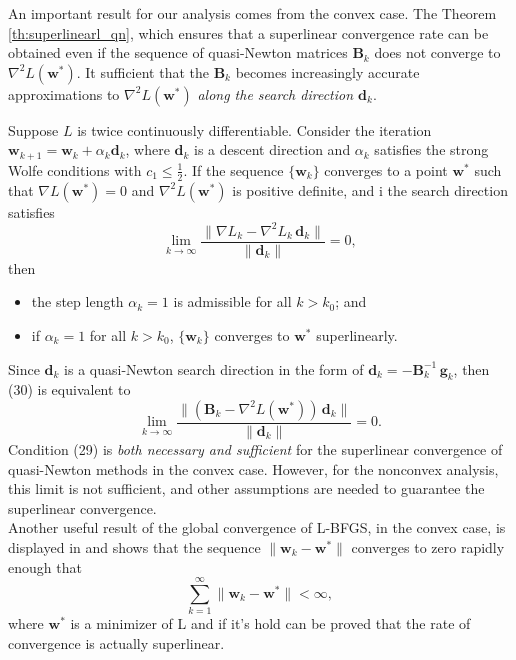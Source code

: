 An important result for our analysis comes from the convex case. The Theorem \ref{th:superlinearl_qn}, which ensures that a superlinear convergence rate can be obtained even if the sequence of quasi-Newton matrices $\mathbf{B}_k$ does not converge to $\nabla^2 L(\mathbf{w}^*)$. It sufficient that the $\mathbf{B}_k$ becomes increasingly accurate approximations to $\nabla^2 L(\mathbf{w}^*)$ \emph{along the search direction $\mathbf{d}_k$}.

\begin{theorem}
\label{th:superlinearl_qn}
Suppose $L$ is twice continuously differentiable. Consider the iteration $\mathbf{w}_{k+1}=\mathbf{w}_k + \alpha_k \mathbf{d}_k$, where $\mathbf{d}_k$ is a descent direction and $\alpha_k$ satisfies the strong Wolfe conditions with $c_1 \leq \frac{1}{2}$. If the sequence $\{ \mathbf{w}_k\}$ converges to a point $\mathbf{w^*}$ such that $\nabla L (\mathbf{w}^*) = 0$ and $\nabla^2 L(\mathbf{w}^*)$ is positive definite, and i the search direction satisfies
\begin{equation}
      \lim_{k\to\infty} \frac{\| \nabla L_k - \nabla^2 L_k \, \mathbf{d}_k\|}{\| \mathbf{d}_k\|} = 0,
\end{equation}
then
\begin{itemize}
    \item the step length $\alpha_k = 1$ is admissible for all $k>k_0$; and
    \item if $\alpha_k = 1$ for all $k>k_0$, $\{ \mathbf{w}_k\}$ converges to $\mathbf{w}^*$ superlinearly. 
\end{itemize}
\end{theorem}
Since $\mathbf{d}_k$ is a quasi-Newton search direction in the form of $\mathbf{d}_k = - \mathbf{B}_k^{-1} \, \mathbf{g}_k$, then (30) is equivalent to
\begin{equation}
      \lim_{k\to\infty} \frac{\| (\mathbf{B}_k - \nabla^2 L(\mathbf{w}^*)) \, \mathbf{d}_k\|}{\| \mathbf{d}_k\|} = 0.
\end{equation}
Condition (29) is \emph{both necessary and sufficient} for the superlinear convergence of quasi-Newton methods in the convex case. However, for the nonconvex analysis, this limit is not sufficient, and other assumptions are needed to guarantee the superlinear convergence.\\ 

Another useful result of the global convergence of L-BFGS, in the convex case, is displayed in \cite{Nocedal} and shows that the sequence $\| \mathbf{w}_k - \mathbf{w}^*\|$ converges to zero rapidly enough that
\begin{equation}\label{eq:seq_to_zero_rapidly}
    \sum_{k=1}^{\infty} \| \mathbf{w}_k - \mathbf{w}^*\| < \infty,
\end{equation}
where $\mathbf{w}^*$ is a minimizer of L and if it's hold can be proved that the rate of
convergence is actually superlinear.\\

